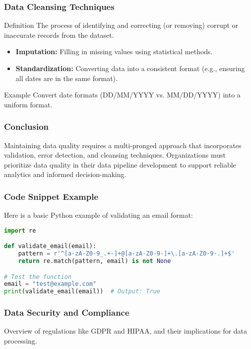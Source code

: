 \documentclass{beamer}
\begin{document}
\begin{frame}[fragile]
    \frametitle{Data Cleansing Techniques}
    \begin{block}{Definition}
        The process of identifying and correcting (or removing) corrupt or inaccurate records from the dataset.
    \end{block}
    \begin{itemize}
        \item \textbf{Imputation:} Filling in missing values using statistical methods.
        \item \textbf{Standardization:} Converting data into a consistent format (e.g., ensuring all dates are in the same format).
    \end{itemize}
    \begin{block}{Example}
        Convert date formats (DD/MM/YYYY vs. MM/DD/YYYY) into a uniform format.
    \end{block}
\end{frame}

\begin{frame}[fragile]
    \frametitle{Conclusion}
    Maintaining data quality requires a multi-pronged approach that incorporates validation, error detection, and cleansing techniques. Organizations must prioritize data quality in their data pipeline development to support reliable analytics and informed decision-making.
\end{frame}

\begin{frame}[fragile]
    \frametitle{Code Snippet Example}
    Here is a basic Python example of validating an email format:
    \begin{lstlisting}[language=Python]
import re

def validate_email(email):
    pattern = r'^[a-zA-Z0-9_.+-]+@[a-zA-Z0-9-]+\.[a-zA-Z0-9-.]+$'
    return re.match(pattern, email) is not None

# Test the function
email = "test@example.com"
print(validate_email(email))  # Output: True
    \end{lstlisting}
\end{frame}

\begin{frame}[fragile]
    \frametitle{Data Security and Compliance}
    Overview of regulations like GDPR and HIPAA, and their implications for data processing.
\end{frame}
\end{document}
